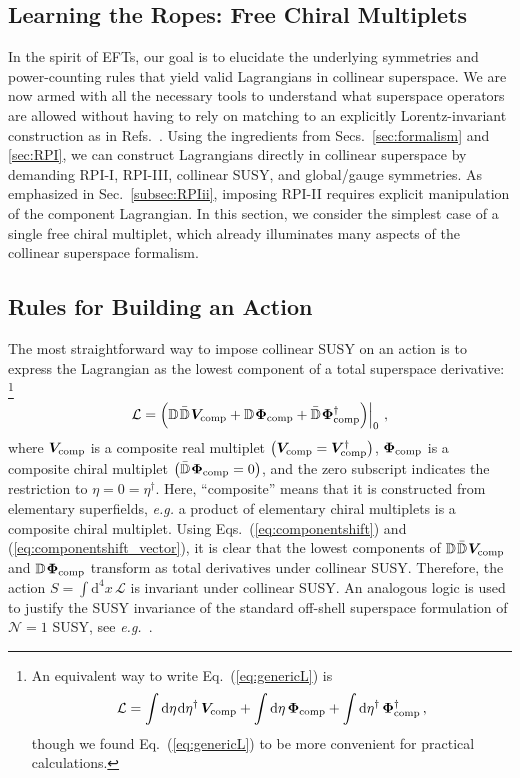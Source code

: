 \documentclass[12pt,document,nofootinbib,superscriptaddress,onecolumn,preprintnumbers,balancelastpage]{article}
\newcommand{\s}{\hspace{0.8pt}}
\DeclareRobustCommand{\Sec}[1]{Sec.~\ref{#1}}
\DeclareRobustCommand{\Secs}[2]{Secs.~\ref{#1} and \ref{#2}}
\DeclareRobustCommand{\Eq}[1]{Eq.~(\ref{#1})}
\DeclareRobustCommand{\Eqs}[2]{Eqs.~(\ref{#1}) and (\ref{#2})}
\DeclareRobustCommand{\Refs}[1]{Refs.~\cite{#1}}
\newcommand{\D}{\mathbb{D}}
\newcommand{\Dbar}{\bar{\mathbb{D}}}
\newcommand{\bPhi}{\boldsymbol{\Phi}}
\newcommand{\bV}{\boldsymbol{V}}
\begin{document}
\begin{spacing}{1.2}
\section{Learning the Ropes:  Free Chiral Multiplets}
\label{sec:BuldingL}

In the spirit of EFTs, our goal is to elucidate the underlying symmetries and power-counting rules that yield valid Lagrangians in collinear superspace.
%
We are now armed with all the necessary tools to understand what superspace operators are allowed without having to rely on matching to an explicitly Lorentz-invariant construction as in \Refs{Cohen:2016jzp, Cohen:2016dcl}.  
%
Using the ingredients from \Secs{sec:formalism}{sec:RPI}, we can construct Lagrangians directly in collinear superspace by demanding RPI-I, RPI-III, collinear SUSY, and global/gauge symmetries.
%
As emphasized in \Sec{subsec:RPIii}, imposing RPI-II requires explicit manipulation of the component Lagrangian.
%
In this section, we consider the simplest case of a single free chiral multiplet, which already illuminates many aspects of the collinear superspace formalism.

\subsection{Rules for Building an Action}

The most straightforward way to impose collinear SUSY on an action is to express the Lagrangian as the lowest component of a total superspace derivative:%
%
\footnote{An equivalent way to write \Eq{eq:genericL} is \begin{align}\mathcal{L} = \int \text{d} \eta \s \text{d} \eta^\dagger \, \bV_{\rm comp} + \int \text{d} \eta \, \bPhi_{\rm comp} + \int \text{d} \eta^\dagger \,\bPhi^\dagger_{\rm comp}\,,\end{align} though we found \Eq{eq:genericL} to be more convenient for practical calculations.}
%
\begin{align}
\label{eq:genericL}
\mathcal{L} =  \Big( \D \s\bar{\D}\s \bV_{\rm comp} + \D \s\bPhi_{\rm comp} + \Dbar \s\bPhi^\dagger_{\rm comp}  \Big) \Big|_{0}\,\,,
\end{align}
%
where $\bV_{\rm comp}$ is a composite real multiplet $\big(\bV_{\rm comp} = \bV^\dagger_{\rm comp}\big)$, $\bPhi_{\rm comp}$ is a composite chiral multiplet $\big(\Dbar\s \bPhi_{\rm comp} = 0\big)$, and the zero subscript indicates the restriction to $\eta = 0 = \eta^\dag$. 
%
Here, ``composite'' means that it is constructed from elementary superfields, \emph{e.g.} a product of elementary chiral multiplets is a composite chiral multiplet.
%
Using \Eqs{eq:componentshift}{eq:componentshift_vector}, it is clear that the lowest components of $\D\s \Dbar\s \bV_{\rm comp}$ and $\D \s \bPhi_{\rm comp}$ transform as total derivatives under collinear SUSY.
%
Therefore, the action $S = \int \text{d}^4 x \, \mathcal{L}$ is invariant under collinear SUSY.
%
An analogous logic is used to justify the SUSY invariance of the standard off-shell superspace formulation of $\mathcal{N} = 1$ SUSY, see \emph{e.g.}~\cite{Bertolini:2013via}.



\end{spacing}
\end{document}
